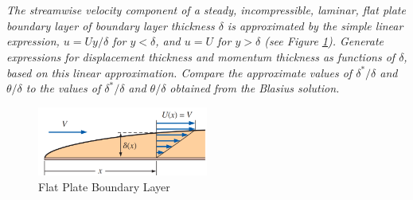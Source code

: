 \section{}

\textit{The streamwise velocity component of a steady, incompressible, laminar, flat plate boundary layer of boundary layer thickness $\delta$ is approximated by the simple linear expression, $u = Uy/\delta$ for $y < \delta$, and $u = U$ for $y > \delta$ (see Figure \ref{fig:q3_flat_plate}). Generate expressions for displacement thickness and momentum thickness as functions of $\delta$, based on this linear approximation. Compare the approximate values of $\delta^*/\delta$ and $\theta/\delta$ to the values of $\delta^*/\delta$ and $\theta/\delta$ obtained from the Blasius solution.}
\begin{figure}[H]
    \centering
    \includegraphics[width=0.5\textwidth]{Questions/Figures/Q3 Problem Diagram.png}
    \caption{Flat Plate Boundary Layer}
    \label{fig:q3_flat_plate}
\end{figure}

